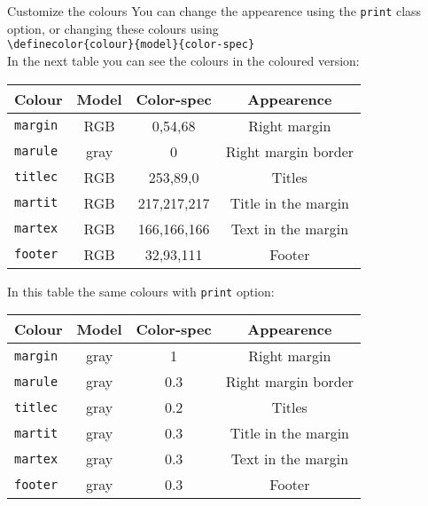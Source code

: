 \documentclass[english]{michael-cv}
\begin{document}
\newpage
\begin{para}{Customize the colours}
You can change the appearence using the \texttt{print} class option, or changing these colours using\\
\null\hspace{4ex}\verb+\definecolor{colour}{model}{color-spec}+\\[1ex]

In the next table you can see the colours in the coloured version:\\[1ex]
\begin{tabular}{lccc}
\toprule
Colour		& Model		& Color-spec	& Appearence	\\
\midrule
\verb+margin+	& RGB		& 0,54,68		& \textcolor{marginins}{Right margin}	\\
\verb+marule+	& gray		& 0			& \textcolor{maruleins}{Right margin border}			\\
\verb+titlec+	& RGB		& 253,89,0		& \textcolor{titlecins}{Titles}	\\
\verb+martit+	& RGB		& 217,217,217		& \textcolor{martitins}{Title in the margin}	\\
\verb+martex+	& RGB 		& 166,166,166		& \textcolor{martexins}{Text in the margin}	\\
\verb+footer+	& RGB		& 32,93,111		& \textcolor{footerins}{Footer}	\\
\bottomrule
\end{tabular}

\vspace{2ex}
In this table the same colours with \verb+print+ option:\\[1ex]
\begin{tabular}{lccc}
\toprule
Colour		& Model		& Color-spec	& Appearence	\\
\midrule
\verb+margin+	& gray 		& 1		& \textcolor{margininsg}{Right margin}	\\
\verb+marule+	& gray 		& 0.3 		& \textcolor{maruleinsg}{Right margin border}	\\
\verb+titlec+	& gray 		& 0.2		& \textcolor{titlecinsg}{Titles}	\\
\verb+martit+	& gray 		& 0.3		& \textcolor{martitinsg}{Title in the margin}	\\
\verb+martex+	& gray 		& 0.3		& \textcolor{martexinsg}{Text in the margin}	\\
\verb+footer+	& gray 		& 0.3		& \textcolor{footerinsg}{Footer}	\\
\bottomrule
\end{tabular}
\end{para}
\end{document}
